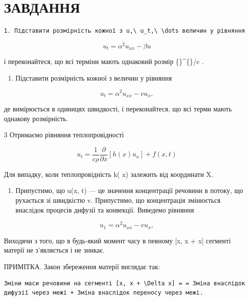 \documentclass[
  ukrainian,
]{article}
\providecommand{\tightlist}{%
  \setlength{\itemsep}{0pt}\setlength{\parskip}{0pt}}
\begin{document}
\section{ЗАВДАННЯ}\label{ux437ux430ux432ux434ux430ux43dux43dux44f-2}

\begin{verbatim}
1. Підставити розмірність кожної з u,\ u_t,\ \dots величин у рівняння
\end{verbatim}

\[
u_t = \alpha^2 u_{xx} - \beta u
\]

і переконайтеся, що всі терміни мають однаковий розмір
\{\}\^{}\{\circ\}/c .

\begin{enumerate}
\def\labelenumi{\arabic{enumi}.}
\setcounter{enumi}{1}
\tightlist
\item
  Підставити розмірність кожної з величин у рівняння
\end{enumerate}

\[
u_t = \alpha^2 u_{xx} - v u_x,
\]

де \upsilon вимірюється в одиницях швидкості, і переконайтеся, що всі
терми мають однакову розмірність.

3 Отримаємо рівняння теплопровідності

\[
u_{t} = \frac{1}{c\rho} \frac{\partial}{\partial x} [h(x) u_{x}] + f(x, t)
\]

Для випадку, коли теплопровідність k\left( x\right) залежить від
координати X.

\begin{enumerate}
\def\labelenumi{\arabic{enumi}.}
\setcounter{enumi}{3}
\tightlist
\item
  Припустимо, що u(x, t) --- це значення концентрації речовини в потоку,
  що рухається зі швидкістю v. Припустимо, що концентрація змінюється
  внаслідок процесів дифузії та конвекції. Виведемо рівняння
\end{enumerate}

\[
u_1 = \alpha^2 u_{xx} - v u_x,
\]

Виходячи з того, що в будь-який момент часу в певному {[}x, x +
\Delta x{]} сегменті матерії не з'являється і не зникає.

ПРИМІТКА. Закон збереження матерії виглядає так:

\begin{verbatim}
Зміни маси речовини на сегменті [x, x + \Delta x] = = Зміна внаслідок дифузії через межі + Зміна внаслідок переносу через межі.
\end{verbatim}
\end{document}
